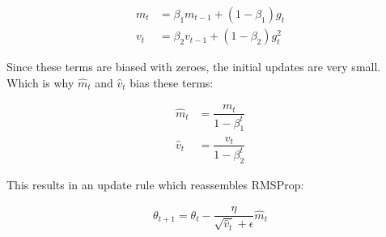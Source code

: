 \begin{align}
    m_t &= \beta_1 m_{t-1} + (1 - \beta_1) g_t \label{eqn:adam:1}\\
    v_t &= \beta_2 v_{t-1} + (1 - \beta_2) g_t^2 \label{eqn:adam:2}
\end{align}

Since these terms are biased with zeroes, the initial updates are very small.
Which is why $\hat{m}_t$ and $\hat{v}_t$ bias these terms:

\begin{align}
\hat{m}_t &= \dfrac{m_t}{1 - \beta^t_1} \label{eqn:adam:3}\\
\hat{v}_t &= \dfrac{v_t}{1 - \beta^t_2} \label{eqn:adam:4}
\end{align}

This results in an update rule which reassembles RMSProp:

\begin{align}
    \theta_{t+1} = \theta_{t} - \dfrac{\eta}{\sqrt{\hat{v}_t} + \epsilon} \hat{m}_t \label{eqn:adam:5}
\end{align}

%

